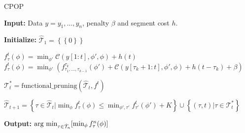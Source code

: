 \documentclass[11pt]{article}
\begin{document}
\begin{algorithm}[H]
    \caption{CPOP}
    \begin{algorithmic}[1]
        \State \textbf{Input:} Data $y=y_1,\dots,y_n$, penalty $\beta$ and segment cost $h$.

        \State \textbf{Initialize:} $\hat{\mathcal{T}}_1=\left\{\left\{0\right\}\right\}$

         
        \If {$\tau = \left\{0\right\}$}
        \State $f^t_{\tau}(\phi)=\min_{\phi'}\mathcal{C}(y[1:t],\phi',\phi)+h(t)$
        \Else {}
        \State $f^t_{\tau}(\phi)=\min_{\phi'}\left(f^{\tau_k}_{\tau_1,\dots,\tau_{k-1}}(\phi')+\mathcal{C}(y[\tau_k+1:t],\phi',\phi)+h(t-\tau_k)+\beta\right)$
        \EndIf
        \EndFor

        \State $\mathcal{T}^*_t = \text{functional\_pruning}(\hat{\mathcal{T}}_t, f^t)$

        \State $\hat{\mathcal{T}}_{t+1}= \left\{\tau\in \hat{\mathcal{T}}_t \big| \min_\phi f_\tau^t(\phi)\leq \min_{\phi',\tau'}f_{\tau'}^t(\phi')+K\right\}\cup \left\{(\tau, t)\big|\tau\in \mathcal{T}^*_t\right\}$
        \EndFor

        \State \textbf{Output:} $\operatorname*{\mbox{arg min}}_{\tau\in \hat{\mathcal{T}}_n}[\min_\phi f^n_\tau(\phi)]$
    \end{algorithmic}
\end{algorithm}
\end{document}
